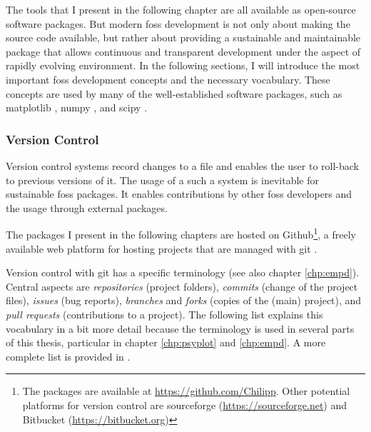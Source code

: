 \begin{refsection}
The tools that I present in the following chapter are all available as open-source software packages. But modern \gls{foss} development is not only about making the source code available, but rather about providing a sustainable and maintainable package that allows continuous and transparent development under the aspect of rapidly evolving environment. In the following sections, I will introduce the most important \gls{foss} development concepts \citep[e.g.][]{StoddenMiguez2014, Shaw2018} and the necessary vocabulary. These concepts are used by many of the well-established software packages, such as matplotlib \citep{Hunter2007}, numpy \citep{Oliphant2006}, and scipy \citep{JonesOliphantPetersonEtAl2001}.

\subsubsection{Version Control} \label{sec:intro-software-github}
Version control systems record changes to a file and enables the user to roll-back to previous versions of it. The usage of a such a system is inevitable for sustainable \gls{foss} packages. It enables contributions by other \gls{foss} developers and the usage through external packages.

The packages I present in the following chapters are hosted on Github\footnote{The packages are available at \url{https://github.com/Chilipp}. Other potential platforms for version control are sourceforge (\url{https://sourceforge.net}) and Bitbucket (\url{https://bitbucket.org})}, a freely available web platform for hosting projects that are managed with git \citep{ChaconStraubPGC2019}.

Version control with git has a specific terminology (see also chapter \ref{chp:empd}). Central aspects are \textit{repositories} (project folders), \textit{commits} (change of the project files), \textit{issues} (bug reports), \textit{branches} and \textit{forks} (copies of the (main) project), and \textit{pull requests} (contributions to a project). The following list explains this vocabulary in a bit more detail because the terminology is used in several parts of this thesis, particular in chapter \ref{chp:psyplot} and \ref{chp:empd}. A more complete list is provided in \cite{Github2019}.


\end{refsection}
